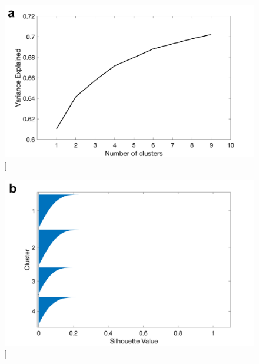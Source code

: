 \documentclass[phd,tocprelim]{cornell}
\renewcommand{\caption}[1]{\singlespacing\hangcaption{#1}\normalspacing}
\begin{document}
\null
\vfill
\begin{figure}[h!]
		\ContinuedFloat
		\captionsetup{labelformat=adja-page}
    \centering
    \includegraphics[width=1\textwidth]{chapter2/SupplementaryFig5a.png}
    \caption[]{}
\end{figure}

\null
\vfill
\clearpage

\null
\vfill
\begin{figure}[h!]
		\ContinuedFloat
		\captionsetup{labelformat=adja-page}
    \centering
    \includegraphics[width=1\textwidth]{chapter2/SupplementaryFig5b.png}
    \caption[]{}
\end{figure}

\null
\vfill
\clearpage
\end{document}
